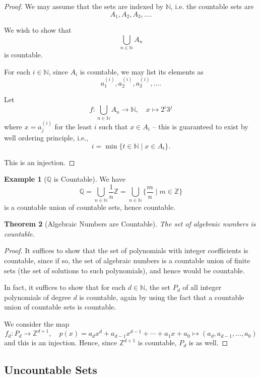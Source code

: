 \documentclass{article}
\newtheorem{theorem}{Theorem}[section]
\theoremstyle{definition}
\newtheorem{example}[theorem]{Example}
\theoremstyle{remark}
\newcommand{\pqty}[1]{\left(#1\right)}
\newcommand{\set}[2]{\{#1\mid #2\}}
\newcommand{\function}[5]{#1:#2\to #3,\quad #4\mapsto #5}
\newcommand{\NN}{\mathbb{N}}
\newcommand{\ZZ}{\mathbb{Z}}
\newcommand{\QQ}{\mathbb{Q}}
\begin{document}
\begin{proof}
    We may assume that the sets are indexed by \(\NN\), i.e. the countable sets are
    \[
        A_1, A_2, A_3, \ldots.
    \]

    We wish to show that
    \[
        \bigcup_{n \in \NN} A_n
    \]
    is countable.

    For each \(i \in \NN\), since \(A_i\) is countable, we may list its elements as
    \[
        a_1^{\pqty{i}}, a_2^{\pqty{i}}, a_3^{\pqty{i}}, \ldots.
    \]

    Let
    \[
        \function{f}{\bigcup_{n \in \NN} A_n}{\NN}{x}{2^i 3^j}
    \]
    where \(x = a_j^{\pqty{i}}\) for the least \(i\) such that \(x \in A_i\) -- this is guaranteed to exist by well ordering principle, i.e.,
    \[
        i = \min\set{t \in \NN}{x \in A_t}.
    \]

    This is an injection.
\end{proof}

\begin{example}[\(\QQ\) is Countable]
    We have
    \[
        \QQ = \bigcup_{n \in \NN} \frac{1}{n} \ZZ = \bigcup_{n \in \NN} \set{\frac{m}{n}}{m \in \ZZ}
    \]
    is a countable union of countable sets, hence countable.
\end{example}

\begin{theorem}[Algebraic Numbers are Countable]
    The set of algebraic numbers is countable.
\end{theorem}

\begin{proof}
    It suffices to show that the set of polynomials with integer coefficients is countable, since if so, the set of algebraic numbers is a countable union of finite sets (the set of solutions to such polynomials), and hence would be countable.

    In fact, it suffices to show that for each \(d \in \NN\), the set \(P_d\) of all integer polynomials of degree \(d\) is countable, again by using the fact that a countable union of countable sets is countable.

    We consider the map
    \[
        \function{f_d}{P_d}{\ZZ^{d + 1}}{p\pqty{x} = a_d x^d + a_{d - 1} x^{d - 1} + \cdots + a_1 x + a_0}{\pqty{a_d, a_{d - 1}, \ldots, a_0}}
    \]
    and this is an injection. Hence, since \(\ZZ^{d + 1}\) is countable, \(P_d\) is as well.
\end{proof}

\subsection{Uncountable Sets}
\label{sec:uncountable-sets}
\end{document}
